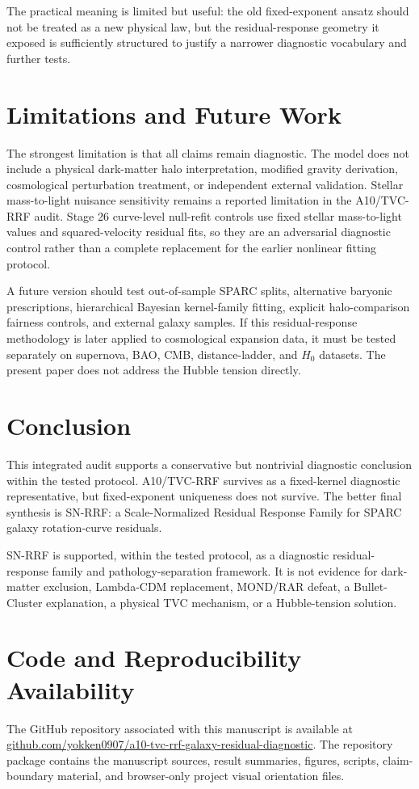 \documentclass[11pt,a4paper]{article}
\begin{document}
The practical meaning is limited but useful: the old fixed-exponent ansatz should not be treated as a new physical law, but the residual-response geometry it exposed is sufficiently structured to justify a narrower diagnostic vocabulary and further tests.

\section{Limitations and Future Work}
The strongest limitation is that all claims remain diagnostic. The model does not include a physical dark-matter halo interpretation, modified gravity derivation, cosmological perturbation treatment, or independent external validation. Stellar mass-to-light nuisance sensitivity remains a reported limitation in the A10/TVC-RRF audit. Stage 26 curve-level null-refit controls use fixed stellar mass-to-light values and squared-velocity residual fits, so they are an adversarial diagnostic control rather than a complete replacement for the earlier nonlinear fitting protocol.

A future version should test out-of-sample SPARC splits, alternative baryonic prescriptions, hierarchical Bayesian kernel-family fitting, explicit halo-comparison fairness controls, and external galaxy samples. If this residual-response methodology is later applied to cosmological expansion data, it must be tested separately on supernova, BAO, CMB, distance-ladder, and $H_0$ datasets. The present paper does not address the Hubble tension directly.

\section{Conclusion}
This integrated audit supports a conservative but nontrivial diagnostic conclusion within the tested protocol. A10/TVC-RRF survives as a fixed-kernel diagnostic representative, but fixed-exponent uniqueness does not survive. The better final synthesis is SN-RRF: a Scale-Normalized Residual Response Family for SPARC galaxy rotation-curve residuals.

SN-RRF is supported, within the tested protocol, as a diagnostic residual-response family and pathology-separation framework. It is not evidence for dark-matter exclusion, Lambda-CDM replacement, MOND/RAR defeat, a Bullet-Cluster explanation, a physical TVC mechanism, or a Hubble-tension solution.

\section*{Code and Reproducibility Availability}
The GitHub repository associated with this manuscript is available at \href{https://github.com/yokken0907/a10-tvc-rrf-galaxy-residual-diagnostic}{github.com/yokken0907/a10-tvc-rrf-galaxy-residual-diagnostic}. The repository package contains the manuscript sources, result summaries, figures, scripts, claim-boundary material, and browser-only project visual orientation files.
\end{document}
